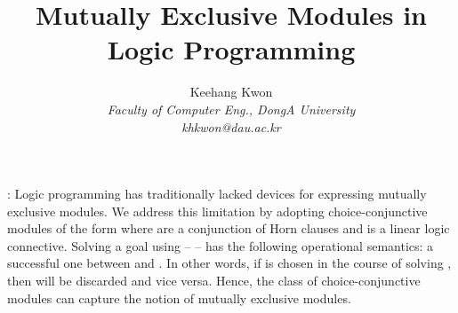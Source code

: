 \documentclass[12pt]{article}
\begin{document}
\newcommand{\sand}{sand} \newcommand{\pand}{pand} \newcommand{\cor}{cor} 

\newcommand{\lb}{\langle}
\newcommand{\rb}{\rangle}
\newcommand{\pr}{prov}
\newcommand{\prG}{intp}
\newcommand{\prSG}{intp_E}
\newcommand{\intp}{intp_o}
\newcommand{\prove}{exec} \newcommand{\np}{invalid} \newcommand{\Ra}{\supset}  
\newcommand{\add}{\oplus} \newcommand{\adc}{\&} \newcommand{\Cscr}{{\cal C}}
\newcommand{\seqweb}{SProlog}
\newcommand{\sprog}{{SProlog}}

\newtheorem{theorem}[lemma]{Theorem}

\newtheorem{proposition}[lemma]{Proposition}

\newtheorem{corollary}[lemma]{Corollary}
\newenvironment{proof}
     {\begin{trivlist}\item[]{\it Proof. }}{\\* \hspace*{\fill} \end{trivlist}}

\newcommand{\seqand}{\prec}
\newcommand{\seqor}{\cup}
\newcommand{\seqandq}[2]{\prec_{#1}^{#2}}
\newcommand{\parandq}[2]{\land_{#1}^{#2}}
\newcommand{\exq}[2]{\exists_{#1}^{#2}}
\newcommand{\ext}{intp_G} 
\title{\bf  Mutually Exclusive Modules  in  Logic Programming }
\author{
 Keehang Kwon\\
\sl \small Faculty of Computer Eng., DongA  University\\
\small khkwon@dau.ac.kr
}
\maketitle









\newcommand{\prov}{ex}


: 
Logic programming has traditionally lacked devices for expressing 
 mutually exclusive modules. We address this limitation 
  by adopting 
   choice-conjunctive modules of the form 
   where   are a conjunction of Horn clauses and 
  is a linear logic connective.   Solving a  goal  using   --  -- has the 
 following operational semantics:  a successful one between  and
 . In other words, if  is chosen in the course of solving , then  will be
discarded and vice versa.  Hence, the class of  choice-conjunctive  modules can capture
the notion  of  mutually exclusive modules.
\end{document}

